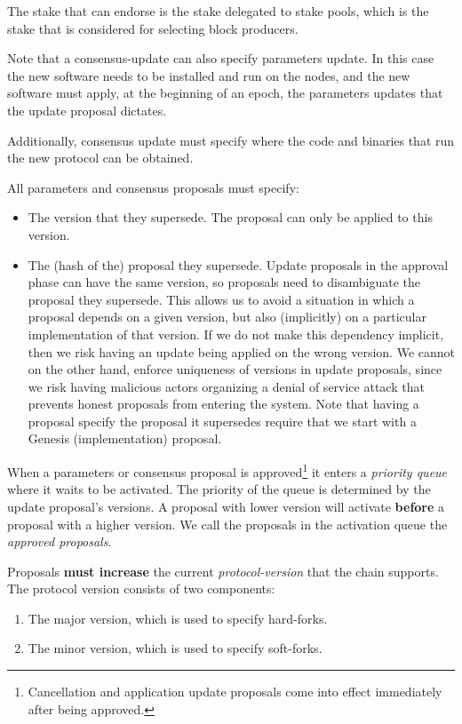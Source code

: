 The stake that can endorse is the stake delegated to stake pools, which is the
stake that is considered for selecting block producers.

Note that a consensus-update can also specify parameters update. In this case
the new software needs to be installed and run on the nodes, and the new
software must apply, at the beginning of an epoch, the parameters updates that
the update proposal dictates.

Additionally, consensus update must specify where the code and binaries that
run the new protocol can be obtained.

All parameters and consensus proposals must specify:
\begin{itemize}
	\item The version that they supersede. The proposal can only be applied to
	this
	version.
	\item The (hash of the) proposal they supersede. Update proposals in the
	approval phase can have the same version, so proposals need to disambiguate
	the proposal they supersede. This allows us to avoid a situation in which a
	proposal depends on a given version, but also (implicitly) on a particular
	implementation of that version. If we do not make this dependency implicit,
	then we risk having an update being applied on the wrong version.
	We cannot on the other hand, enforce uniqueness of versions in update
	proposals, since we risk having malicious actors organizing a denial of
	service attack that prevents honest proposals from entering the system.
	Note that having a proposal specify the proposal it supersedes require that
	we
	start with a Genesis (implementation) proposal.
\end{itemize}

When a parameters or consensus proposal is approved\footnote{Cancellation and
	application update proposals come into effect immediately after being
	approved.} it enters a \emph{priority queue} where it waits to be activated.
The priority of the queue is determined by the update proposal's versions. A
proposal with lower version will activate \textbf{before} a
proposal with a
higher version.
%
We call the proposals in the activation queue the \emph{approved proposals}.

Proposals \textbf{must increase} the current \emph{protocol-version} that the
chain supports. The protocol version consists of two components:
\begin{enumerate}
	\item The major version, which is used to specify hard-forks.
	\item The minor version, which is used to specify soft-forks.
\end{enumerate}

